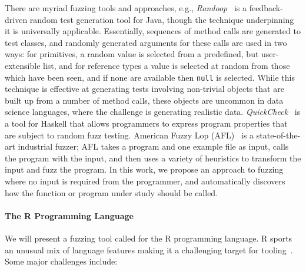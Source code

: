 \documentclass[sigplan,anonymous,review]{acmart}
\begin{document}
There are myriad fuzzing tools and approaches, e.g., \emph{Randoop}~\cite{pacheco2007randoop} is a feedback-driven random test generation tool for Java, though the technique underpinning it is universally applicable.
Essentially, sequences of method calls are generated to test classes, and randomly generated arguments for these calls are used in two ways: for primitives, a random value is selected from a predefined, but user-extensible list, and for reference types a value is selected at random from those which have been seen, and if none are available then {\tt null} is selected.
While this technique is effective at generating tests involving non-trivial objects that are built up from a number of method calls, these objects are uncommon in data science languages, where the challenge is generating realistic data.
\emph{QuickCheck}~\cite{quickcheck} is a tool for Haskell that allows programmers to express program properties that are subject to random fuzz testing.
American Fuzzy Lop (AFL)~\cite{afl} is a state-of-the-art industrial fuzzer; AFL takes a program and one example file as input, calls the program with the input, and then uses a variety of heuristics to transform the input and fuzz the program.
 In this work, we propose an approach to fuzzing where no input is required from the programmer, and automatically discovers how the function or program under study should be called.

\paragraph{The R Programming Language}

We will present a fuzzing tool called \tool for the R programming language.
R sports an unusual mix of language features making it a challenging target for
tooling~\cite{morandat2012evaluating}. 
Some major challenges include:
\end{document}
